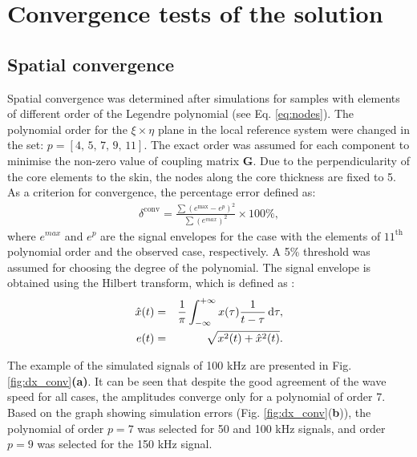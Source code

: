 \section{Convergence tests of the solution}
\label{sec:convergence}


\subsection{Spatial convergence}
Spatial convergence was determined after simulations for samples with elements of different order of the Legendre polynomial (see Eq. \ref{eq:nodes}).
The polynomial order for the \(\xi\times \eta\) plane in the local reference system were changed in the set: \(p=[4,\,5,\,7,\,9,\, 11]\).
The exact order was assumed for each component to minimise the non-zero value of coupling matrix \(\textbf{G}\).
Due to the perpendicularity of the core elements to the skin, the nodes along the core thickness are fixed to 5.
As a criterion for convergence, the percentage error defined as:
\begin{eqnarray}
	\delta^{\mathrm{conv}} = \frac{\sum{\left(e^{\mathrm{max}}-e^{p}\right)^2}}{\sum{\left(e^{max}\right)^2}} \times 100\%,
	\label{eq:perc_err_conv}
\end{eqnarray}
where \(e^{max}\) and \(e^{p}\) are the signal envelopes for the case with the elements of \(11^{\mathrm{th}}\) polynomial order and the observed case, respectively.
A 5\% threshold was assumed for choosing the degree of the polynomial.
The signal envelope is obtained using the Hilbert transform, which is defined as \cite{staszewski2004health}:
\begin{eqnarray}
	\label{eq:hilbert}
	\hat{x}(t) &=& \frac{1}{\pi}\int_{-\infty}^{+\infty}x(\tau)\frac{1}{t-\tau}\mathop{}\!\mathrm{d}\tau,\\
	\label{eq:envelope}
	e(t) &=& \sqrt{x^2(t)+\hat{x}^2(t)}.
\end{eqnarray}
%
%

The example of the simulated signals of 100 \unit{\kHz} are presented in Fig. \ref{fig:dx_conv}\textbf{(a)}.
It can be seen that despite the good agreement of the wave speed for all cases, the amplitudes converge only for a polynomial of order 7.
Based on the graph showing simulation errors (Fig. \ref{fig:dx_conv}(\textbf{b})), the polynomial of order \(p=7\) was selected for 50 and 100 \unit{\kHz} signals, and order \(p=9\) was selected for the 150 \unit{\kHz} signal.
 
